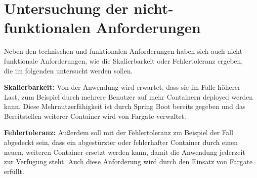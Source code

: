 \section{Untersuchung der nicht-funktionalen Anforderungen}
Neben den technischen und funktionalen Anforderungen haben sich auch nicht-funktionale Anforderungen, wie die Skalierbarkeit oder Fehlertoleranz ergeben, die im folgenden untersucht werden sollen.

\textbf{Skalierbarkeit:} Von der Anwendung wird erwartet, dass sie im Falle höherer Last, zum Beispiel durch mehrere Benutzer auf mehr Containern deployed werden kann. Diese Mehrnutzerfähigkeit ist durch \gls{Spring Boot} bereits gegeben und das Bereitstellen weiterer Container wird von \gls{Fargate} verwaltet.

\textbf{Fehlertoleranz:} Außerdem soll mit der Fehlertoleranz zm Beispiel der Fall abgedeckt sein, dass ein abgestürzter oder fehlerhafter Container durch einen neuen, weiteren Container ersetzt werden kann, damit die Anwendung jederzeit zur Verfügung steht. Auch diese Anforderung wird durch den Einsatz von \gls{Fargate} erfüllt.
\pagebreak